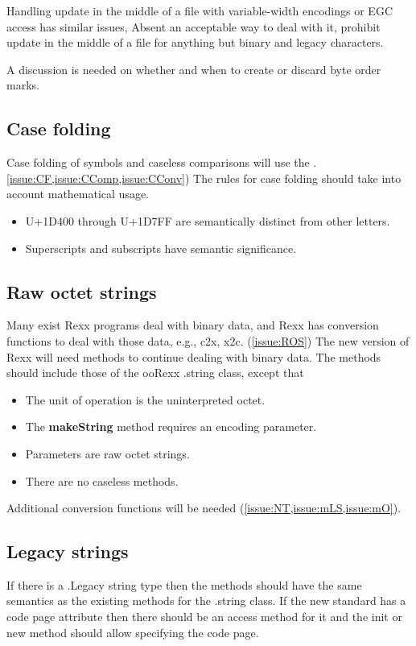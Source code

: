 \documentclass[b4paper]{article}
\begin{document}
Handling update in the middle of a file with variable-width encodings
or EGC access has similar issues, Absent an acceptable way to deal
with it, prohibit update in the middle of a file for anything but
binary and legacy characters.


A discussion is needed on whether and when to create or discard byte order marks.

\subsection{Case folding}

Case folding of symbols and caseless comparisons will use the .
\cref{issue:CF,issue:CComp,issue:CConv})
The rules for case folding should take into account mathematical usage.
\begin{itemize}
\item U+1D400 through U+1D7FF are semantically distinct from other letters.
\item Superscripts and subscripts have semantic significance.
\end{itemize}

\subsection{Raw octet strings}
Many exist Rexx programs deal with binary data,
and Rexx has conversion functions to deal with those data,
e.g., c2x, x2c.
(\cref{issue:ROS})
The new version of Rexx will need methods to continue dealing with binary data.
The methods should include those of the ooRexx .string class, except that
\begin{itemize}
\item The unit of operation is the uninterpreted octet.
\item The \textbf{makeString} method requires an encoding parameter.
\item Parameters are raw octet strings.
\item There are no caseless methods.
\end{itemize}

Additional conversion functions will be needed (\cref{issue:NT,issue:mLS,issue:mO}).

\subsection{Legacy strings}

If there is a .Legacy string type then the methods should have the
same semantics as the existing methods for the .string class.
If the new standard has a code page attribute then there should be an
access method for it and the init or new method should allow
specifying the code page.
\end{document}
